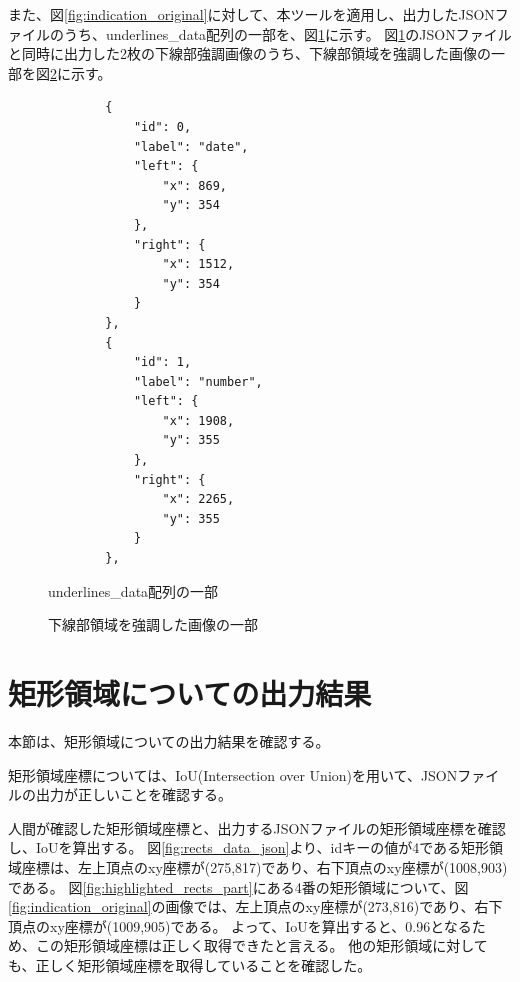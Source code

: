 また、図\ref{fig:indication_original}に対して、本ツールを適用し、出力したJSONファイルのうち、underlines\_data配列の一部を、図\ref{fig:underlines_data_json}に示す。
図\ref{fig:underlines_data_json}のJSONファイルと同時に出力した2枚の下線部強調画像のうち、下線部領域を強調した画像の一部を図\ref{fig:highlighted_underlines_part}に示す。

\lstset{language=}
\begin{figure}[t]
    \begin{lstlisting}
        {
            "id": 0,
            "label": "date",
            "left": {
                "x": 869,
                "y": 354
            },
            "right": {
                "x": 1512,
                "y": 354
            }
        },
        {
            "id": 1,
            "label": "number",
            "left": {
                "x": 1908,
                "y": 355
            },
            "right": {
                "x": 2265,
                "y": 355
            }
        },
    \end{lstlisting}
    \caption{underlines\_data配列の一部}\label{fig:underlines_data_json}
\end{figure}

\begin{figure}[t]
    \begin{center}
        \caption{下線部領域を強調した画像の一部}
        \label{fig:highlighted_underlines_part}
    \end{center}
\end{figure}

\section{矩形領域についての出力結果}\label{sec:result_rect}
本節は、矩形領域についての出力結果を確認する。

矩形領域座標については、IoU(Intersection over Union)を用いて、JSONファイルの出力が正しいことを確認する。

人間が確認した矩形領域座標と、出力するJSONファイルの矩形領域座標を確認し、IoUを算出する。
図\ref{fig:rects_data_json}より、idキーの値が4である矩形領域座標は、左上頂点のxy座標が(275,817)であり、右下頂点のxy座標が(1008,903)である。
図\ref{fig:highlighted_rects_part}にある4番の矩形領域について、図\ref{fig:indication_original}の画像では、左上頂点のxy座標が(273,816)であり、右下頂点のxy座標が(1009,905)である。
よって、IoUを算出すると、0.96となるため、この矩形領域座標は正しく取得できたと言える。
他の矩形領域に対しても、正しく矩形領域座標を取得していることを確認した。

